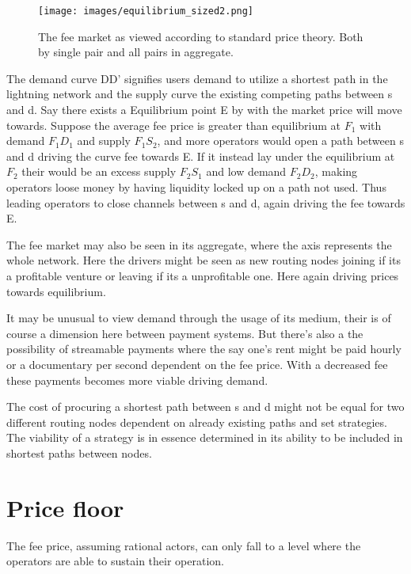 \begin{figure}[!htb]
	\hspace*{-0.3cm} 
	\centering
	\texttt{[image: images/equilibrium\_sized2.png]}
	\caption{ The fee market as viewed according to standard price theory. Both by single pair and all pairs in aggregate. 
		}
		\label{fig:equilibrium}
		\hspace*{2mm} 	
\end{figure}

The demand curve DD' signifies users demand to utilize a shortest path in the lightning network and the supply curve the existing competing paths between s and d. Say there exists a Equilibrium point E by with the market price will move towards. Suppose the average fee price is greater than equilibrium at $F_{1}$ with demand $F_{1}D_{1}$ and supply $F_{1}S_{2}$, and more operators would open a path between s and d driving the curve fee towards E. If it instead lay under the equilibrium at $F_2$ their would be an excess supply $F_{2}S_{1}$ and low demand $F_{2}D_{2}$, making operators loose money by having liquidity locked up on a path not used. Thus leading operators to close channels between s and d, again driving the fee towards E.

The fee market may also be seen in its aggregate, where the axis represents the whole network. Here the drivers might be seen as new routing nodes joining if its a profitable venture or leaving if its a unprofitable one. Here again driving prices towards equilibrium. 

It may be unusual to view demand through the usage of its medium, their is of course a dimension here between payment systems. But there's also a the possibility of streamable payments where the say one's rent might be paid hourly or a documentary per second dependent on the fee price. With a decreased fee these payments becomes more viable driving demand.

The cost of procuring a shortest path between s and d might not be equal for two different routing nodes dependent on already existing paths and set strategies. The viability of a strategy is in essence determined in its ability to be included in shortest paths between nodes.

\section{Price floor}

The fee price, assuming rational actors, can only fall to a level where the operators are able to sustain their operation.  

